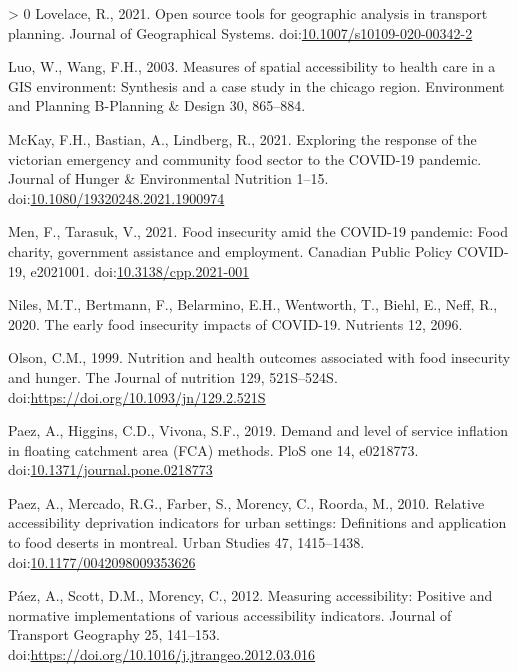 \documentclass[]{elsarticle} %
\newlength{\cslhangindent}
\newenvironment{CSLReferences}[3] %
 {%
  \setlength{\parindent}{0pt}
  \ifodd #1 \everypar{\setlength{\hangindent}{\cslhangindent}}\ignorespaces\fi
  \ifnum #2 > 0
  \setlength{\parskip}{#2\baselineskip}
  \fi
 }%
 {}
\begin{document}
\begin{CSLReferences}{1}{0}
\leavevmode\hypertarget{ref-lovelace2021open}{}%
Lovelace, R., 2021. Open source tools for geographic analysis in
transport planning. Journal of Geographical Systems.
doi:\href{https://doi.org/10.1007/s10109-020-00342-2}{10.1007/s10109-020-00342-2}

\leavevmode\hypertarget{ref-luo2003measures}{}%
Luo, W., Wang, F.H., 2003. Measures of spatial accessibility to health
care in a GIS environment: Synthesis and a case study in the chicago
region. Environment and Planning B-Planning \& Design 30, 865--884.

\leavevmode\hypertarget{ref-mckay2021exploring}{}%
McKay, F.H., Bastian, A., Lindberg, R., 2021. Exploring the response of
the victorian emergency and community food sector to the COVID-19
pandemic. Journal of Hunger \& Environmental Nutrition 1--15.
doi:\href{https://doi.org/10.1080/19320248.2021.1900974}{10.1080/19320248.2021.1900974}

\leavevmode\hypertarget{ref-men2021food}{}%
Men, F., Tarasuk, V., 2021. Food insecurity amid the COVID-19 pandemic:
Food charity, government assistance and employment. Canadian Public
Policy COVID-19, e2021001.
doi:\href{https://doi.org/10.3138/cpp.2021-001}{10.3138/cpp.2021-001}

\leavevmode\hypertarget{ref-niles2020early}{}%
Niles, M.T., Bertmann, F., Belarmino, E.H., Wentworth, T., Biehl, E.,
Neff, R., 2020. The early food insecurity impacts of COVID-19. Nutrients
12, 2096.

\leavevmode\hypertarget{ref-olson1999nutrition}{}%
Olson, C.M., 1999. Nutrition and health outcomes associated with food
insecurity and hunger. The Journal of nutrition 129, 521S--524S.
doi:\url{https://doi.org/10.1093/jn/129.2.521S}

\leavevmode\hypertarget{ref-paez2019demand}{}%
Paez, A., Higgins, C.D., Vivona, S.F., 2019. Demand and level of service
inflation in floating catchment area (FCA) methods. PloS one 14,
e0218773.
doi:\href{https://doi.org/10.1371/journal.pone.0218773}{10.1371/journal.pone.0218773}

\leavevmode\hypertarget{ref-paez2010relative}{}%
Paez, A., Mercado, R.G., Farber, S., Morency, C., Roorda, M., 2010.
Relative accessibility deprivation indicators for urban settings:
Definitions and application to food deserts in montreal. Urban Studies
47, 1415--1438.
doi:\href{https://doi.org/10.1177/0042098009353626}{10.1177/0042098009353626}

\leavevmode\hypertarget{ref-paez2012measuring}{}%
Páez, A., Scott, D.M., Morency, C., 2012. Measuring accessibility:
Positive and normative implementations of various accessibility
indicators. Journal of Transport Geography 25, 141--153.
doi:\url{https://doi.org/10.1016/j.jtrangeo.2012.03.016}


\end{CSLReferences}
\end{document}
